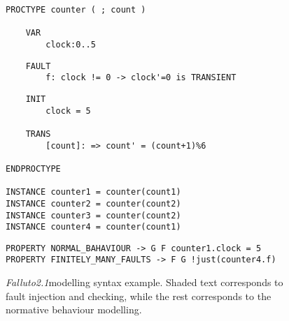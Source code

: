 \documentclass[12pt]{article}
\newcommand{\falluto}{\mbox{\textit{Falluto2.1}}}
\begin{document}
\begin{figure}[H]
    \centering
\begin{framed}
\begin{verbatim}
PROCTYPE counter ( ; count )

    VAR
        clock:0..5
\end{verbatim}
\vspace{-0.5cm}
\begin{shaded}
\vspace{-0.5cm}
\begin{verbatim}
    FAULT
        f: clock != 0 -> clock'=0 is TRANSIENT
\end{verbatim}
\vspace{-0.5cm}
\end{shaded}
\vspace{-0.5cm}
\begin{verbatim}
    INIT
        clock = 5

    TRANS
        [count]: => count' = (count+1)%6

ENDPROCTYPE

INSTANCE counter1 = counter(count1)
INSTANCE counter2 = counter(count2)
INSTANCE counter3 = counter(count2)
INSTANCE counter4 = counter(count1)
\end{verbatim}
\vspace{-0.5cm}
\begin{shaded}
\vspace{-0.5cm}
\begin{verbatim}
PROPERTY NORMAL_BAHAVIOUR -> G F counter1.clock = 5
PROPERTY FINITELY_MANY_FAULTS -> F G !just(counter4.f)
\end{verbatim}
\vspace{-0.5cm}
\end{shaded}
\vspace{-0.5cm}
\end{framed}
    \caption{\falluto modelling syntax example. Shaded text corresponds to fault injection and checking, while the rest corresponds to the normative behaviour modelling.}
\label{example}

\end{figure}


%
%
%
%
%
%
%
\end{document}
